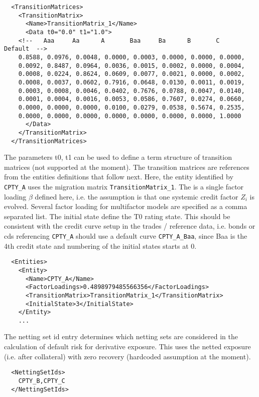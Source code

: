 \documentclass[12pt, a4paper]{article}
\begin{document}
\begin{verbatim}
  <TransitionMatrices>
    <TransitionMatrix>
      <Name>TransitionMatrix_1</Name>
      <Data t0="0.0" t1="1.0">
    <!--   Aaa     Aa      A       Baa     Ba      B       C    Default  -->
	0.8588, 0.0976, 0.0048, 0.0000, 0.0003, 0.0000, 0.0000, 0.0000, 
	0.0092, 0.8487, 0.0964, 0.0036, 0.0015, 0.0002, 0.0000, 0.0004, 
	0.0008, 0.0224, 0.8624, 0.0609, 0.0077, 0.0021, 0.0000, 0.0002, 
	0.0008, 0.0037, 0.0602, 0.7916, 0.0648, 0.0130, 0.0011, 0.0019, 
	0.0003, 0.0008, 0.0046, 0.0402, 0.7676, 0.0788, 0.0047, 0.0140, 
	0.0001, 0.0004, 0.0016, 0.0053, 0.0586, 0.7607, 0.0274, 0.0660, 
	0.0000, 0.0000, 0.0000, 0.0100, 0.0279, 0.0538, 0.5674, 0.2535, 
	0.0000, 0.0000, 0.0000, 0.0000, 0.0000, 0.0000, 0.0000, 1.0000  
      </Data>
    </TransitionMatrix>
  </TransitionMatrices>
\end{verbatim}

The parameters t0, t1 can be used to define a term structure of transition matrices (not supported at the moment). The
transition matrices are references from the entities definitions that follow next. Here, the entity identified by
\verb+CPTY_A+ uses the migration matrix \verb+TransitionMatrix_1+. The is a single factor loading $\beta$ defined here,
i.e. the assumption is that one systemic credit factor $Z_i$ is evolved. Several factor loading for multifactor models
are specified as a comma separated list. The initial state define the T0 rating state. This should be consistent with
the credit curve setup in the trades / reference data, i.e. bonds or cds referencing \verb+CPTY_A+ should use a default
curve \verb+CPTY_A_Baa+, since Baa is the 4th credit state and numbering of the initial states starts at $0$.

\begin{verbatim}
  <Entities>
    <Entity>
      <Name>CPTY_A</Name>
      <FactorLoadings>0.4898979485566356</FactorLoadings>
      <TransitionMatrix>TransitionMatrix_1</TransitionMatrix>
      <InitialState>3</InitialState>
    </Entity>
    ...
\end{verbatim}

The netting set id entry determines which netting sets are considered in the calculation of default risk for derivative
exposure. This uses the netted exposure (i.e. after collateral) with zero recovery (hardcoded assumption at the moment).

\begin{verbatim}
  <NettingSetIds>
    CPTY_B,CPTY_C
  </NettingSetIds>
\end{verbatim}
\end{document}
